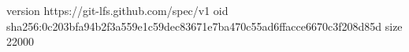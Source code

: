 version https://git-lfs.github.com/spec/v1
oid sha256:0c203bfa94b2f3a559e1c59dec83671e7ba470c55ad6ffacce6670c3f208d85d
size 22000
